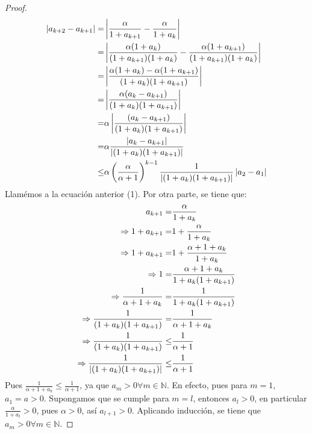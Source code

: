 \documentclass[12pt]{article}
\begin{document}
\begin{enumerate}
\begin{proof}
        \begin{equation*}
            \begin{split}
                \left| a_{k+2}-a_{k+1} \right|=&\left| \frac{\alpha}{1+a_{k+1}}-\frac{\alpha}{1+a_{k}} \right|\\
                =&\left| \frac{\alpha(1+a_{k})}{(1+a_{k+1})(1+a_{k})}-\frac{\alpha(1+a_{k+1})}{(1+a_{k+1})(1+a_{k})} \right|\\
                =&\left| \frac{\alpha(1+a_{k})-\alpha(1+a_{k+1})}{(1+a_{k})(1+a_{k+1})} \right|\\
                =&\left| \frac{\alpha(a_{k}-a_{k+1})}{(1+a_{k})(1+a_{k+1})} \right|\\
                =&\alpha\left| \frac{(a_{k}-a_{k+1})}{(1+a_{k})(1+a_{k+1})} \right|\\
                =&\alpha{\frac{\left| a_{k}-a_{k+1} \right|}{\left| (1+a_{k})(1+a_{k+1}) \right|}}\\
                \leq&\alpha\left(\frac{\alpha}{\alpha+1}\right)^{k-1}{\frac{1}{\left| (1+a_{k})(1+a_{k+1}) \right|}}\left| a_2-a_1 \right|\\
            \end{split}
        \end{equation*}
        Llamémos a la ecuación anterior (1). Por otra parte, se tiene que:
        \begin{equation*}
            \begin{split}
                a_{k+1}=&\frac{\alpha}{1+a_{k}}\\
                \Rightarrow 1+a_{k+1}=&1+\frac{\alpha}{1+a_{k}}\\
                \Rightarrow 1+a_{k+1}=&1+\frac{\alpha+1+a_k}{1+a_{k}}\\
                \Rightarrow 1=&\frac{\alpha+1+a_k}{1+a_{k}(1+a_{k+1})}\\
                \Rightarrow \frac{1}{\alpha+1+a_k}=&\frac{1}{1+a_{k}(1+a_{k+1})}\\
                \Rightarrow \frac{1}{(1+a_{k})(1+a_{k+1})}=&\frac{1}{\alpha+1+a_k}\\
                \Rightarrow \frac{1}{(1+a_{k})(1+a_{k+1})}\leq&\frac{1}{\alpha+1}\\
                \Rightarrow \frac{1}{\left| (1+a_{k})(1+a_{k+1}) \right|}\leq&\frac{1}{\alpha+1}
            \end{split}
        \end{equation*}
        Pues $\frac{1}{\alpha+1+a_k}\leq\frac{1}{\alpha+1}$, ya que $a_m>0\forall m\in\mathbb{N}$. En efecto, pues para $m=1$, $a_1=a>0$. Supongamos que se cumple para $m=l$, entonces $a_l>0$, en particular $\frac{\alpha}{1+a_l}>0$, pues $\alpha>0$, así $a_{l+1}>0$. Aplicando inducción, se tiene que $a_m>0\forall m\in\mathbb{N}$.

\end{proof}
\end{enumerate}
\end{document}
